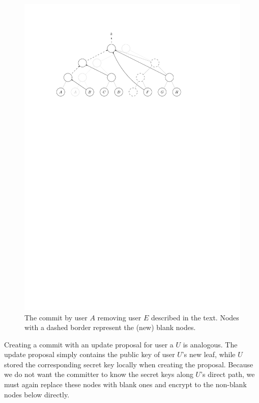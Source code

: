 \begin{figure}
	\begin{center}
		\includegraphics{figures/treekem-remove}
	\end{center}
	\caption{The commit by user $A$ removing user $E$ described in the text. Nodes with a dashed border represent the (new) blank nodes.}\label{fig:treekem-remove}
\end{figure}

Creating a commit with an update proposal for user a $U$ is analogous. The update proposal simply contains the public key of user $U$'s new leaf, while $U$ stored the corresponding secret key locally when creating the proposal. Because we do not want the committer to know the secret keys along $U$'s direct path, we must again replace these nodes with blank ones and encrypt to the non-blank nodes below directly.

